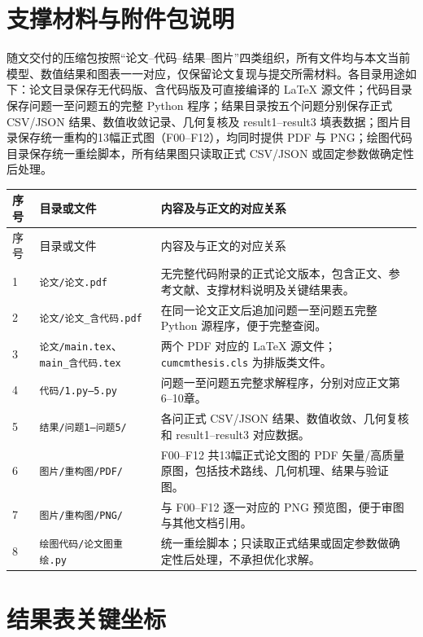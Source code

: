 \appendix

\section{支撑材料与附件包说明}
随文交付的压缩包按照“论文--代码--结果--图片”四类组织，所有文件均与本文当前模型、数值结果和图表一一对应，仅保留论文复现与提交所需材料。各目录用途如下：论文目录保存无代码版、含代码版及可直接编译的 \LaTeX{} 源文件；代码目录保存问题一至问题五的完整 Python 程序；结果目录按五个问题分别保存正式 CSV/JSON 结果、数值收敛记录、几何复核及 result1--result3 填表数据；图片目录保存统一重构的13幅正式图（F00--F12），均同时提供 PDF 与 PNG；绘图代码目录保存统一重绘脚本，所有结果图只读取正式 CSV/JSON 或固定参数做确定性后处理。

\begin{longtable}{p{} p{} p{}}
\toprule
序号 & 目录或文件 & 内容及与正文的对应关系 \\
\midrule
\endfirsthead
\toprule
序号 & 目录或文件 & 内容及与正文的对应关系 \\
\midrule
\endhead
1 & \texttt{论文/论文.pdf} & 无完整代码附录的正式论文版本，包含正文、参考文献、支撑材料说明及关键结果表。 \\
2 & \texttt{论文/论文\_含代码.pdf} & 在同一论文正文后追加问题一至问题五完整 Python 源程序，便于完整查阅。 \\
3 & \texttt{论文/main.tex}、\texttt{main\_含代码.tex} & 两个 PDF 对应的 \LaTeX{} 源文件；\texttt{cumcmthesis.cls} 为排版类文件。 \\
4 & \texttt{代码/1.py--5.py} & 问题一至问题五完整求解程序，分别对应正文第6--10章。 \\
5 & \texttt{结果/问题1--问题5/} & 各问正式 CSV/JSON 结果、数值收敛、几何复核和 result1--result3 对应数据。 \\
6 & \texttt{图片/重构图/PDF/} & F00--F12 共13幅正式论文图的 PDF 矢量/高质量原图，包括技术路线、几何机理、结果与验证图。 \\
7 & \texttt{图片/重构图/PNG/} & 与 F00--F12 逐一对应的 PNG 预览图，便于审图与其他文档引用。 \\
8 & \texttt{绘图代码/论文图重绘.py} & 统一重绘脚本；只读取正式结果或固定参数做确定性后处理，不承担优化求解。 \\
\bottomrule
\end{longtable}

\section{结果表关键坐标}

